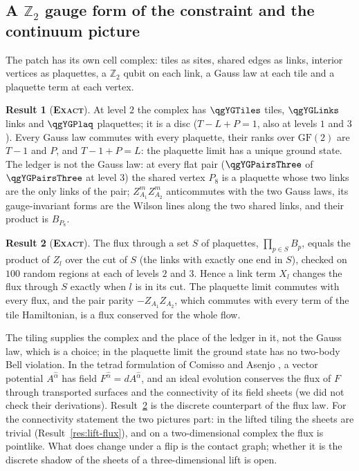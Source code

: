 \documentclass[11pt]{article}
\newcommand{\exact}{\textbf{\textsc{Exact}}}
\theoremstyle{definition}
\newtheorem{result}{Result}
\begin{document}
\subsection{A $\mathbb{Z}_2$ gauge form of the constraint and the continuum picture}
The patch has its own cell complex: tiles as sites, shared edges as links, interior vertices as plaquettes, a $\mathbb{Z}_2$ qubit on each link, a Gauss law at each tile and a plaquette term at each vertex.
\begin{result}[\exact]\label{res:ham-gauge}
At level $2$ the complex has $\qgYGTiles$ tiles, $\qgYGLinks$ links and $\qgYGPlaq$ plaquettes; it is a disc ($T-L+P=1$, also at levels $1$ and $3$). Every Gauss law commutes with every plaquette, their ranks over $\mathrm{GF}(2)$ are $T-1$ and $P$, and $T-1+P=L$: the plaquette limit has a unique ground state. The ledger is not the Gauss law: at every flat pair ($\qgYGPairsThree$ of $\qgYGPairsThree$ at level $3$) the shared vertex $P_8$ is a plaquette whose two links are the only links of the pair; $Z^m_{A_1}Z^m_{A_2}$ anticommutes with the two Gauss laws, its gauge-invariant forms are the Wilson lines along the two shared links, and their product is $B_{P_8}$.
\end{result}
\begin{result}[\exact]\label{res:flux-transfer}
The flux through a set $S$ of plaquettes, $\prod_{p\in S}B_p$, equals the product of $Z_l$ over the cut of $S$ (the links with exactly one end in $S$), checked on $100$ random regions at each of levels $2$ and $3$. Hence a link term $X_l$ changes the flux through $S$ exactly when $l$ is in its cut. The plaquette limit commutes with every flux, and the pair parity $-Z_{A_1}Z_{A_2}$, which commutes with every term of the tile Hamiltonian, is a flux conserved for the whole flow.
\end{result}
The tiling supplies the complex and the place of the ledger in it, not the Gauss law, which is a choice; in the plaquette limit the ground state has no two-body Bell violation. In the tetrad formulation of Comisso and Asenjo \cite{comisso2026}, a vector potential $A^{\hat\alpha}$ has field $F^{\hat\alpha}=dA^{\hat\alpha}$, and an ideal evolution conserves the flux of $F$ through transported surfaces and the connectivity of its field sheets (we did not check their derivations). Result~\ref{res:flux-transfer} is the discrete counterpart of the flux law. For the connectivity statement the two pictures part: in the lifted tiling the sheets are trivial (Result~\ref{res:lift-flux}), and on a two-dimensional complex the flux is pointlike. What does change under a flip is the contact graph; whether it is the discrete shadow of the sheets of a three-dimensional lift is open.
\end{document}
